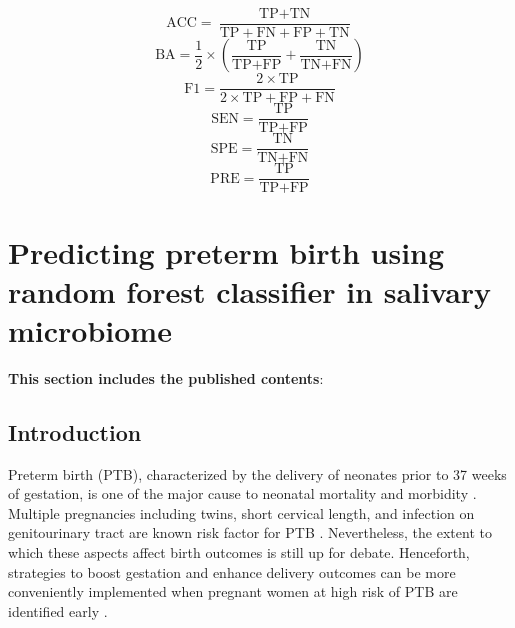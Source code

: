 \documentclass[11pt, a4paper, onecolumn, oneside]{report}
\begin{document}
        \begin{equation}
            \textrm{ACC} = \frac{\textrm{TP} + \textrm{TN}}{\textrm{TP} + \textrm{FN} + \textrm{FP} + \textrm{TN}}
            \label{eq:ACC}
        \end{equation}
        \begin{equation}
            \textrm{BA} = \frac{1}{2} \times (\frac{\textrm{TP}}{\textrm{TP} + \textrm{FP}} + \frac{\textrm{TN}}{\textrm{TN} + \textrm{FN}})
            \label{eq:BA}
        \end{equation}
        \begin{equation}
            \textrm{F1} = \frac{2 \times \textrm{TP}}{2 \times \textrm{TP} + \textrm{FP} + \textrm{FN}}
            \label{eq:F1}
        \end{equation}
        \begin{equation}
            \textrm{SEN} = \frac{\textrm{TP}}{\textrm{TP} + \textrm{FP}}
            \label{eq:SEN}
        \end{equation}
        \begin{equation}
            \textrm{SPE} = \frac{\textrm{TN}}{\textrm{TN} + \textrm{FN}}
            \label{eq:SPE}
        \end{equation}
        \begin{equation}
            \textrm{PRE} = \frac{\textrm{TP}}{\textrm{TP} + \textrm{FP}}
            \label{eq:PRE}
        \end{equation}
        \clearpage
    \newpage

    \section{Predicting preterm birth using random forest classifier in salivary microbiome}
        \label{section:PTB}

        \textbf{This section includes the published contents}: \\
         \nocite{PTB-JW-1}

        \subsection{Introduction}
            Preterm birth (PTB), characterized by the delivery of neonates prior to 37 weeks of gestation, is one of the major cause to neonatal mortality and morbidity \cite{PTB-rate-1}. Multiple pregnancies including twins, short cervical length, and infection on genitourinary tract are known risk factor for PTB \cite{PTB-cause-1}. Nevertheless, the extent to which these aspects affect birth outcomes is still up for debate. Henceforth, strategies to boost gestation and enhance delivery outcomes can be more conveniently implemented when pregnant women at high risk of PTB are identified early \cite{PTB-care-1}.
\end{document}
